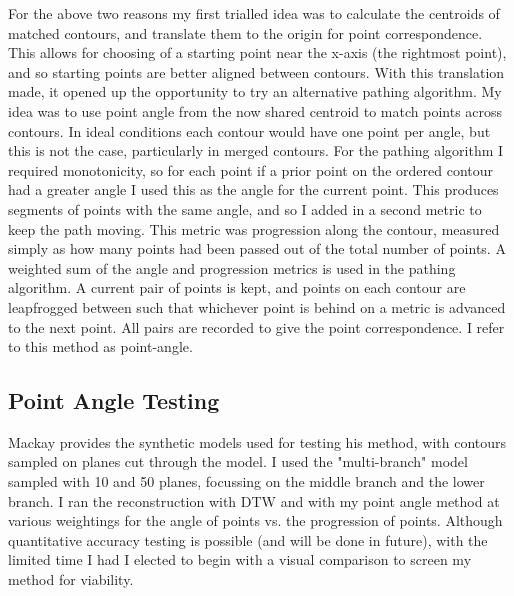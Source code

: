 \documentclass[10pt]{article}
\begin{document}
For the above two reasons my first trialled idea was to calculate the centroids of matched contours, and translate them to the origin for point correspondence. This allows for choosing of a starting point near the x-axis (the rightmost point), and so starting points are better aligned between contours. With this translation made, it opened up the opportunity to try an alternative pathing algorithm. My idea was to use point angle from the now shared centroid to match points across contours. In ideal conditions each contour would have one point per angle, but this is not the case, particularly in merged contours. For the pathing algorithm I required monotonicity, so for each point if a prior point on the ordered contour had a greater angle I used this as the angle for the current point. This produces segments of points with the same angle, and so I added in a second metric to keep the path moving. This metric was progression along the contour, measured simply as how many points had been passed out of the total number of points. A weighted sum of the angle and progression metrics is used in the pathing algorithm. A current pair of points is kept, and points on each contour are leapfrogged between such that whichever point is behind on a metric is advanced to the next point. All pairs are recorded to give the point correspondence. I refer to this method as point-angle.

\subsection{Point Angle Testing}

Mackay provides the synthetic models used for testing his method, with contours sampled on planes cut through the model. I used the "multi-branch" model sampled with 10 and 50 planes, focussing on the middle branch and the lower branch. I ran the reconstruction with DTW and with my point angle method at various weightings for the angle of points vs. the progression of points. Although quantitative accuracy testing is possible (and will be done in future), with the limited time I had I elected to begin with a visual comparison to screen my method for viability. 
\end{document}

